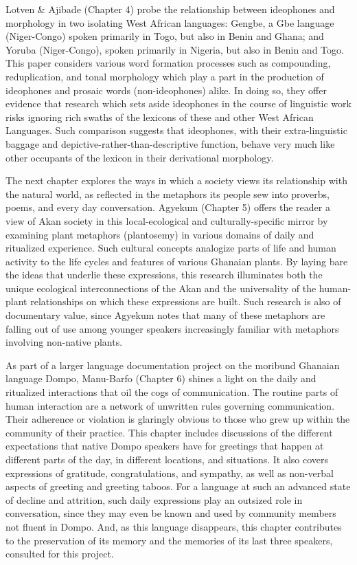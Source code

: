 \documentclass[output=paper,colorlinks,citecolor=brown]{langscibook}
\begin{document}
Lotven \& Ajibade (Chapter 4) probe the relationship between ideophones and morphology in two isolating West African languages: Gengbe, a Gbe language (Niger-Congo) spoken primarily in Togo, but also in Benin and Ghana; and Yoruba (Niger-Congo), spoken primarily in Nigeria, but also in Benin and Togo. This paper considers various word formation processes such as compounding, reduplication, and tonal morphology which play a part in the production of ideophones and prosaic words (non-ideophones) alike. In doing so, they offer evidence that research which sets aside ideophones in the course of linguistic work risks ignoring rich swaths of the lexicons of these and other West African Languages. Such comparison suggests that ideophones, with their extra-linguistic baggage and depictive-rather-than-descriptive function, behave very much like other occupants of the lexicon in their derivational morphology.

The next chapter explores the ways in which a society views its relationship with the natural world, as reflected in the metaphors its people sew into proverbs, poems, and every day conversation. Agyekum (Chapter 5) offers the reader a view of Akan society in this local-ecological and culturally-specific mirror by examining plant metaphors (plantosemy) in various domains of daily and ritualized experience. Such cultural concepts analogize parts of life and human activity to the life cycles and features of various Ghanaian plants. By laying bare the ideas that underlie these expressions, this research illuminates both the unique ecological interconnections of the Akan and the universality of the human-plant relationships on which these expressions are built. Such research is also of documentary value, since Agyekum notes that many of these metaphors are falling out of use among younger speakers increasingly familiar with metaphors involving non-native plants.

As part of a larger language documentation project on the moribund Ghanaian language Dompo, Manu-Barfo (Chapter 6) shines a light on the daily and ritualized interactions that oil the cogs of communication. The routine parts of human interaction are a network of unwritten rules governing communication. Their adherence or violation is glaringly obvious to those who grew up within the community of their practice. This chapter includes discussions of the different expectations that native Dompo speakers have for greetings that happen at different parts of the day, in different locations, and situations. It also covers expressions of gratitude, congratulations, and sympathy, as well as non-verbal aspects of greeting and greeting taboos. For a language at such an advanced state of decline and attrition, such daily expressions play an outsized role in conversation, since they may even be known and used by community members not fluent in Dompo. And, as this language disappears, this chapter contributes to the preservation of its memory and the memories of its last three speakers, consulted for this project.
\end{document}
